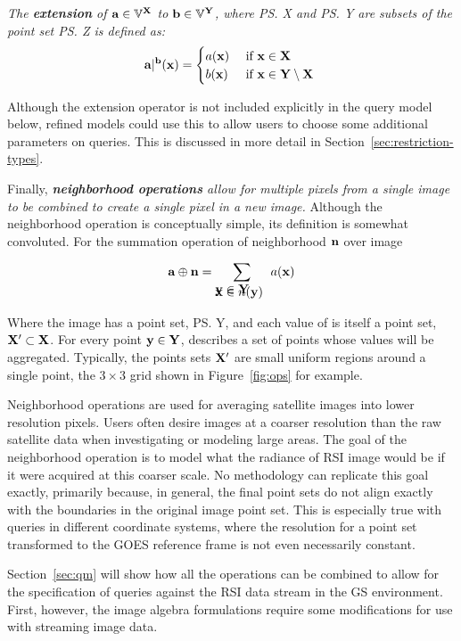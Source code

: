 \documentclass{ucdthesis}       %
\begin{document}
\emph{The {\bf extension} of ${\bf{a}} \in {\ensuremath{\mathbb{V}}}^{{\bf{X}}}$ to
  ${\bf{b}} \in {\ensuremath{\mathbb{V}}}^{{\bf{Y}}}$, where \ps{X} and \ps{Y} are subsets of
  the point set \ps{Z} is defined as:
\[
    {\bf{a}}|^{{\bf{b}}}({\bf{x}}) =
    \begin{cases}
      a({\bf{x}}) & \text{ if ${\bf{x}} \in {\ensuremath{\bf{X}}}$ } \\
      b({\bf{x}}) & \text{ if ${\bf{x}} \in {\ensuremath{\bf{Y}}} \setminus {\ensuremath{\bf{X}}} $ }      
    \end{cases}
\]}

Although the extension operator is not included explicitly in the
query model below, refined models could use this to
allow users to choose some additional parameters on queries.  This is
discussed in more detail in Section~\ref{sec:restriction-types}.

Finally, \emph{{\bf neighborhood operations} allow for multiple pixels
  from a single image to be combined to create a single pixel in
  a new image.}  Although the neighborhood operation is conceptually
simple, its definition is somewhat convoluted.  For the summation
operation of neighborhood ${\bf{n}}$ over image 

\[\im{a} \oplus \im{n}= \sum_{\parbox{1.5cm}{$\pt{y}\in\ps{Y}\vspace*{-10pt}\\  \pt{x}\in n(\pt{y})$}} a(\pt{x})\]

Where the image  has a point set, \ps{Y}, and each value of
 is itself a point set, ${\bf{X'}} \subset {\ensuremath{\bf{X}}}$.  For every
point ${\bf{y}} \in {\ensuremath{\bf{Y}}}$,  describes a set of points whose
values will be aggregated.  Typically, the points sets ${\bf{X'}}$ are
small uniform regions around a single point, the $3\times 3$ grid shown in
Figure~\ref{fig:ops} for example.

Neighborhood operations are used for averaging satellite images into
lower resolution pixels.  Users often desire images at a coarser
resolution than the raw satellite data when investigating or modeling
large areas.  The goal of the neighborhood operation is to model what
the radiance of \ac{RSI} image would be if it were acquired at this
coarser scale.  No methodology can replicate this goal exactly,
primarily because, in general, the final point sets do not align
exactly with the boundaries in the original image point set.  This is
especially true with queries in different coordinate systems, where
the resolution for a point set transformed to the \ac{GOES} reference
frame is not even necessarily constant.

Section~\ref{sec:qm} will show how all the operations can be combined
to allow for the specification of queries against the
\ac{RSI} data stream in the \ac{GS} environment.  First, however, the
image algebra formulations require some modifications for use with
streaming image data.
\end{document}
